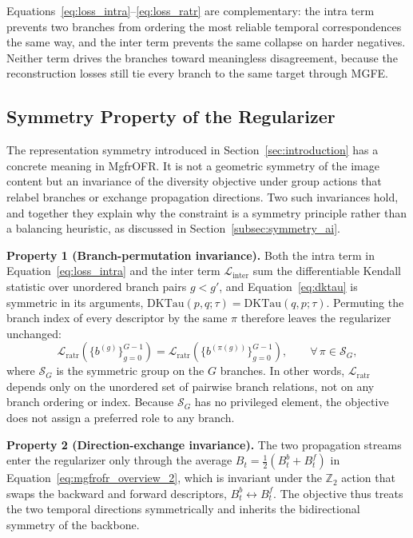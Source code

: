 \documentclass[symmetry,article,submit,pdftex,moreauthors]{Definitions/mdpi}
\begin{document}
Equations~\eqref{eq:loss_intra}--\eqref{eq:loss_ratr} are complementary: the intra term prevents two branches from ordering the most reliable temporal correspondences the same way, and the inter term prevents the same collapse on harder negatives. Neither term drives the branches toward meaningless disagreement, because the reconstruction losses still tie every branch to the same target through MGFE.

\subsection{Symmetry Property of the Regularizer}
\label{subsec:symmetry_property}

The representation symmetry introduced in Section~\ref{sec:introduction} has a concrete meaning in MgfrOFR. It is not a geometric symmetry of the image content but an invariance of the diversity objective under group actions that relabel branches or exchange propagation directions. Two such invariances hold, and together they explain why the constraint is a symmetry principle rather than a balancing heuristic, as discussed in Section~\ref{subsec:symmetry_ai}.

\textbf{Property 1 (Branch-permutation invariance).} Both the intra term in Equation~\eqref{eq:loss_intra} and the inter term $\mathcal{L}_{\text{inter}}$ sum the differentiable Kendall statistic over unordered branch pairs $g<g'$, and Equation~\eqref{eq:dktau} is symmetric in its arguments, $\mathrm{DKTau}(p,q;\tau)=\mathrm{DKTau}(q,p;\tau)$. Permuting the branch index of every descriptor by the same $\pi$ therefore leaves the regularizer unchanged:
\begin{equation}
\mathcal{L}_{\text{ratr}}\!\left(\{b^{(g)}\}_{g=0}^{G-1}\right)
=
\mathcal{L}_{\text{ratr}}\!\left(\{b^{(\pi(g))}\}_{g=0}^{G-1}\right),
\qquad
\forall\,\pi\in\mathcal{S}_G,
\label{eq:branch_permutation}
\end{equation}
where $\mathcal{S}_G$ is the symmetric group on the $G$ branches. In other words, $\mathcal{L}_{\text{ratr}}$ depends only on the unordered set of pairwise branch relations, not on any branch ordering or index. Because $\mathcal{S}_G$ has no privileged element, the objective does not assign a preferred role to any branch.

\textbf{Property 2 (Direction-exchange invariance).} The two propagation streams enter the regularizer only through the average $B_t=\tfrac{1}{2}(B_t^{b}+B_t^{f})$ in Equation~\eqref{eq:mgfrofr_overview_2}, which is invariant under the $\mathbb{Z}_2$ action that swaps the backward and forward descriptors, $B_t^{b}\!\leftrightarrow\!B_t^{f}$. The objective thus treats the two temporal directions symmetrically and inherits the bidirectional symmetry of the backbone.
\end{document}
